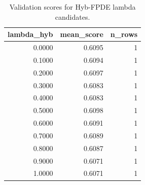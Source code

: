 \begin{table}[t]
\caption{Validation scores for Hyb-FPDE lambda candidates.}
\label{tab:lambda_distribution_computed}
\centering
\begin{tabular}{rrr}
\toprule
lambda\_hyb & mean\_score & n\_rows \\
\midrule
0.0000 & 0.6095 & 1 \\
0.1000 & 0.6094 & 1 \\
0.2000 & 0.6097 & 1 \\
0.3000 & 0.6083 & 1 \\
0.4000 & 0.6083 & 1 \\
0.5000 & 0.6098 & 1 \\
0.6000 & 0.6091 & 1 \\
0.7000 & 0.6089 & 1 \\
0.8000 & 0.6087 & 1 \\
0.9000 & 0.6071 & 1 \\
1.0000 & 0.6071 & 1 \\
\bottomrule
\end{tabular}

\end{table}
